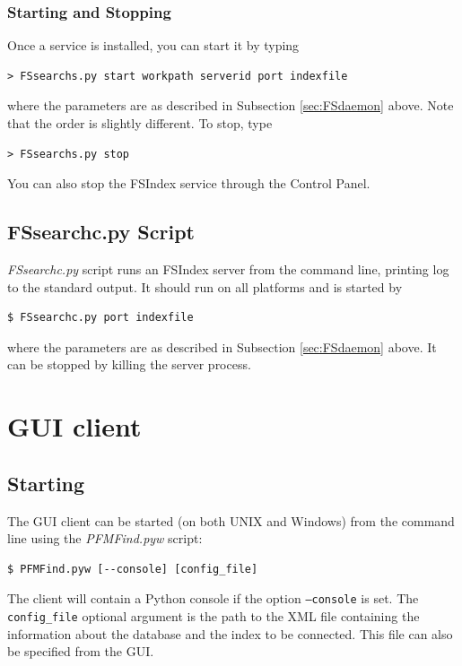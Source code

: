 \documentclass[11pt]{article}
\begin{document}
\subsubsection{Starting and Stopping}

Once a service is installed, you can start it by typing 
\begin{verbatim}
> FSsearchs.py start workpath serverid port indexfile
\end{verbatim}
where the parameters are as described in Subsection \ref{sec:FSdaemon} above. Note that the order is slightly different. To stop, type
\begin{verbatim}
> FSsearchs.py stop
\end{verbatim}
You can also stop the FSIndex service through the Control Panel.

\subsection{FSsearchc.py Script}\label{sec:FSscript}

\textit{FSsearchc.py} script runs an FSIndex server from the command line, printing log to the standard output. It should run on all platforms and is started by 
\begin{verbatim}
$ FSsearchc.py port indexfile
\end{verbatim}
where the parameters are as described in Subsection \ref{sec:FSdaemon} above. It can be stopped by killing the server process.

\section{GUI client}

\subsection{Starting}

The GUI client can be started (on both UNIX and Windows) from the command line using the \textit{PFMFind.pyw} script:
\begin{verbatim}
$ PFMFind.pyw [--console] [config_file]
\end{verbatim}

The client will contain a Python console if the option \texttt{--console} is set. The \texttt{config\_file} optional argument is the path to the XML file containing the information about the database and the index to be connected. This file can also be specified from the GUI.
\end{document}
